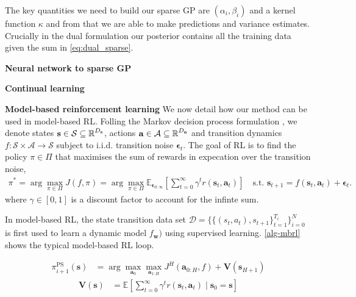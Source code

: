 \documentclass{article}
\newcommand{\state}{\ensuremath{\mathbf{s}}}
\newcommand{\action}{\ensuremath{\mathbf{a}}}
\newcommand{\noise}{\ensuremath{\bm\epsilon}}
\newcommand{\discount}{\ensuremath{\gamma}}
\newcommand{\Horizon}{\ensuremath{H}}
\newcommand{\stateDomain}{\ensuremath{\mathcal{S}}}
\newcommand{\actionDomain}{\ensuremath{\mathcal{A}}}
\newcommand{\policyDomain}{\ensuremath{\Pi}}
\newcommand{\rewardFn}{\ensuremath{r}}
\newcommand{\transitionFn}{\ensuremath{f}}
\newcommand{\stateValueFn}{\ensuremath{\mathbf{V}}}
\newcommand{\policy}{\ensuremath{\pi}}
\begin{document}
The key quantities we need to build our sparse GP are $(\alpha_i, \beta_i)$ and a kernel function $\kappa$  and from that we are able to make predictions and variance estimates. Crucially in the dual formulation our posterior contains all the training data given the sum in \cref{eq:dual_sparse}.

\textbf{Neural network to sparse GP}

\textbf{Continual learning}

\textbf{Model-based reinforcement learning}
We now detail how our method can be used in model-based RL.
Folling the Markov decision process formulation \cite{bellmanDynamic1956}, we
denote states \(\state \in \stateDomain \subseteq \R^{D_{\state}} \), actions \(\action \in \actionDomain \subseteq \R^{D_{\action}}\) and
transition dynamics \(\transitionFn: \stateDomain \times \actionDomain \rightarrow \stateDomain \) subject to  i.i.d. transition noise \(\noise_{t}\).
The goal of RL is to find the policy \(\pi \in \Pi \) that maximises the sum of rewards
in expecation over the transition noise,
\begin{align} \label{eq-model-free-objective}
\policy^{*} = \arg \max_{\policy \in \policyDomain} J(\transitionFn, \policy) = \arg \max_{\policy \in \policyDomain} \mathbb{E}_{\noise_{0:\infty}} \left[ \sum_{t=0}^{\infty} \discount^{t} \rewardFn(\state_{t},\action_{t}) \right]
\quad \text{s.t. } \state_{t+1} = \transitionFn(\state_{t}, \action_{t}) + \noise_{t}.
\end{align}
where $\gamma \in [0, 1]$ is a discount factor to account for the infinte sum.


In model-based RL, the state transition data set \(\mathcal{D} = \{\{(s_{t},a_{t}), s_{t+1}\}^{T_{i}}_{t=1}\}_{i=0}^{N}\) is first used to
learn a dynamic model \(f_{\mathbf{w}})\) using supervised learning.
\cref{alg-mbrl} shows the typical model-based RL loop.

\begin{subequations}
\begin{align} \label{eq-fast-update-mpc}
  \policy_{i+1}^{\text{PS}}(\state) &= \arg \max_{\action_{0}} \max_{\action_{1:\Horizon}}
J^{\Horizon}(\action_{0:\Horizon}, \transitionFn) + \stateValueFn(\state_{\Horizon+1})
\end{align}
\end{subequations}
\begin{subequations}
\begin{align} \label{eq-fast-update-mpc-old}
  \stateValueFn(\state) &= \mathbb{E} \left[ \sum_{t=0}^{\infty}     \discount^{t} \rewardFn(\state_{t},\action_{t}) \mid \state_{0}=\state \right] \label{eq-fast-update-mpc}
\end{align}
\end{subequations}
\end{document}
